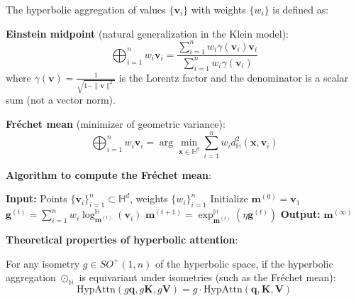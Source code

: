 \begin{definition}\label{def:agregacion_hiperbolica}
The hyperbolic aggregation of values $\{\mathbf{v}_i\}$ with weights $\{w_i\}$ is defined as:

\textbf{Einstein midpoint} (natural generalization in the Klein model):
\begin{equation}
\bigoplus_{i=1}^n w_i \mathbf{v}_i = \frac{\sum_{i=1}^n w_i \gamma(\mathbf{v}_i) \mathbf{v}_i}{\sum_{i=1}^n w_i \gamma(\mathbf{v}_i)}
\end{equation}
where $\gamma(\mathbf{v}) = \frac{1}{\sqrt{1-\|\mathbf{v}\|^2}}$ is the Lorentz factor and the denominator is a scalar sum (not a vector norm).

\textbf{Fréchet mean} (minimizer of geometric variance):
\begin{equation}
\bigoplus_{i=1}^n w_i \mathbf{v}_i = \arg\min_{\mathbf{x} \in \mathbb{H}^d} \sum_{i=1}^n w_i d_{\mathbb{H}}^2(\mathbf{x}, \mathbf{v}_i)
\end{equation}
\end{definition}

\textbf{Algorithm to compute the Fréchet mean}:

\begin{algorithm}[H]
\caption{Hyperbolic Fréchet Mean}
\begin{algorithmic}[1]
    \State \textbf{Input:} Points $\{\mathbf{v}_i\}_{i=1}^n \subset \mathbb{H}^d$, weights $\{w_i\}_{i=1}^n$
    \State Initialize $\mathbf{m}^{(0)} = \mathbf{v}_1$
        \State $\mathbf{g}^{(t)} = \sum_{i=1}^n w_i \log_{\mathbf{m}^{(t)}}^{\mathbb{H}}(\mathbf{v}_i)$
        \State $\mathbf{m}^{(t+1)} = \exp_{\mathbf{m}^{(t)}}^{\mathbb{H}}(\eta \mathbf{g}^{(t)})$
    \EndFor
    \State \textbf{Output:} $\mathbf{m}^{(\infty)}$
\end{algorithmic}
\end{algorithm}

\textbf{Theoretical properties of hyperbolic attention}:

\begin{proposition}\label{prop:equivarianza_atencion_hiperbolica}
For any isometry $g \in SO^+(1,n)$ of the hyperbolic space, if the hyperbolic aggregation $\odot_{\mathbb{H}}$ is equivariant under isometries (such as the Fréchet mean):
\begin{equation}
\text{HypAttn}(g\mathbf{q}, g\mathbf{K}, g\mathbf{V}) = g \cdot \text{HypAttn}(\mathbf{q}, \mathbf{K}, \mathbf{V})
\end{equation}
\end{proposition}

